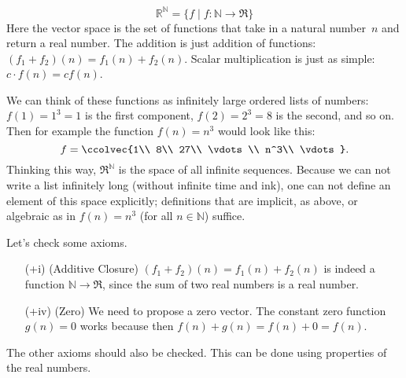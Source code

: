 \begin{example}
\[ \mathbb{R}^\mathbb{N} = \{f \mid f \colon \mathbb{N} \rightarrow \Re \} \]
Here the vector space is the set of functions that take in a natural number~$n$ and return a real number.  The addition is just addition of functions: $(f_1 + f_2)(n) = f_1(n) + f_2(n)$.  Scalar multiplication is just as simple: $c \cdot f(n) = cf(n)$.



We can think of these functions as infinitely large ordered lists of numbers: \(f(1)=1^3=1\) is the first component, \(f(2)=2^3=8\) is the second, and so on. Then for example the function \(f(n)=n^3\) would look like this:
\[
f=\ccolvec{1\\ 8\\ 27\\ \vdots\\ n^3\\ \vdots }.
\]
Thinking this way, \(\Re^\mathbb{N}\) is the space of all infinite sequences. 
Because we can not write a list infinitely long (without infinite time and ink), one can not define an element of this space explicitly; definitions that are implicit, as above, or algebraic as in $f(n)=n^3$ (for all $n \in \mathbb{N}$) suffice.

Let's check some axioms.

\begin{itemize}
\item[(+i)] (Additive Closure) $(f_1 + f_2)(n)=f_1(n) +f_2(n)$ is indeed a function 
$\mathbb{N} \rightarrow \Re$, since the sum of two real numbers is a real number.

\item[(+iv)] (Zero) We need to propose a zero vector.  The constant zero function $g(n) = 0$ works because then $f(n) + g(n) = f(n) + 0 = f(n)$.
\end{itemize}
The other axioms should also be checked.  This can be done using  properties of the real numbers.
\end{example}

